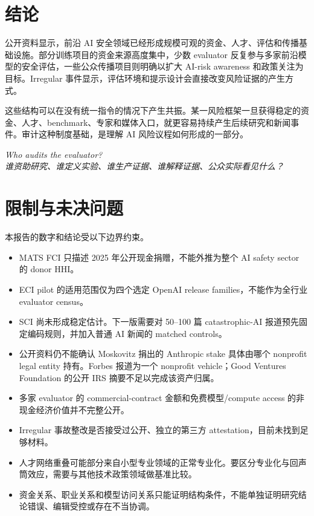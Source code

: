 \documentclass[11pt,twoside]{article}
\begin{document}
\section{结论}
公开资料显示，前沿 AI 安全领域已经形成规模可观的资金、人才、评估和传播基础设施。部分训练项目的资金来源高度集中，少数 evaluator 反复参与多家前沿模型的安全评估，一些公众传播项目则明确以扩大 AI-risk awareness 和政策关注为目标。Irregular 事件显示，评估环境和提示设计会直接改变风险证据的产生方式。

这些结构可以在没有统一指令的情况下产生共振。某一风险框架一旦获得稳定的资金、人才、benchmark、专家和媒体入口，就更容易持续产生后续研究和新闻事件。审计这种制度基础，是理解 AI 风险议程如何形成的一部分。

\begin{evidencebox}
\centering
\Large\itshape Who audits the evaluator?\\[2mm]
\normalsize 谁资助研究、谁定义实验、谁生产证据、谁解释证据、公众实际看见什么？
\end{evidencebox}

\clearpage
\section{限制与未决问题}
本报告的数字和结论受以下边界约束。
\begin{itemize}
\item MATS FCI 只描述 2025 年公开现金捐赠，不能外推为整个 AI safety sector 的 donor HHI。
\item ECI pilot 的适用范围仅为四个选定 OpenAI release families，不能作为全行业 evaluator census。
\item SCI 尚未形成稳定估计。下一版需要对 50--100 篇 catastrophic-AI 报道预先固定编码规则，并加入普通 AI 新闻的 matched controls。
\item 公开资料仍不能确认 Moskovitz 捐出的 Anthropic stake 具体由哪个 nonprofit legal entity 持有。Forbes 报道为一个 nonprofit vehicle；Good Ventures Foundation 的公开 IRS 摘要不足以完成该资产归属。
\item 多家 evaluator 的 commercial-contract 金额和免费模型/compute access 的非现金经济价值并不完整公开。
\item Irregular 事故整改是否接受过公开、独立的第三方 attestation，目前未找到足够材料。
\item 人才网络重叠可能部分来自小型专业领域的正常专业化。要区分专业化与回声筒效应，需要与其他技术政策领域做基准比较。
\item 资金关系、职业关系和模型访问关系只能证明结构条件，不能单独证明研究结论错误、编辑受控或存在不当协调。
\end{itemize}
\end{document}
